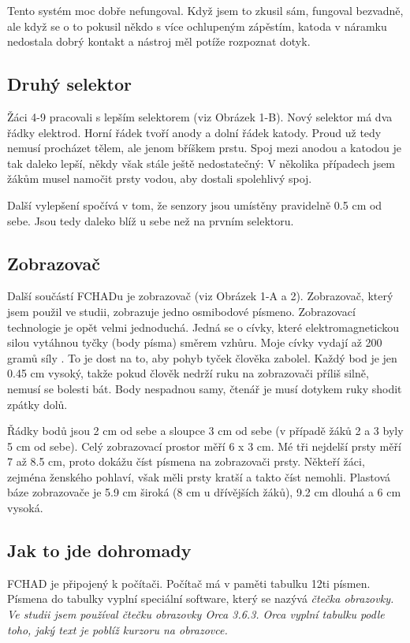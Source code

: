Tento systém moc dobře nefungoval. Když jsem to zkusil sám, fungoval bezvadně, ale když se o to pokusil někdo s více ochlupeným zápěstím, katoda v náramku nedostala dobrý kontakt a nástroj měl potíže rozpoznat dotyk.

\subsection{Druhý selektor}

Žáci 4-9 pracovali s lepším selektorem (viz Obrázek 1-B). Nový selektor má dva řádky elektrod. Horní řádek tvoří anody a dolní řádek katody.  Proud už tedy nemusí procházet tělem, ale jenom bříškem prstu.  Spoj mezi anodou a katodou je tak daleko lepší, někdy však stále ještě nedostatečný: V několika případech jsem žákům musel namočit prsty vodou, aby dostali spolehlivý spoj.

Další vylepšení spočívá v tom, že senzory jsou umístěny pravidelně 0.5 cm od sebe.  Jsou tedy daleko blíž u sebe než na prvním selektoru.

\subsection{Zobrazovač}
Další součástí FCHADu je zobrazovač (viz Obrázek 1-A a 2).  Zobrazovač, který jsem použil ve studii, zobrazuje jedno osmibodové písmeno.  Zobrazovací technologie je opět velmi jednoduchá.  Jedná se o cívky, které elektromagnetickou silou vytáhnou tyčky (body písma) směrem vzhůru.  Moje cívky vydají až 200 gramů síly \citep{multicomp}.  To je dost na to, aby pohyb tyček člověka zabolel.  Každý bod je jen 0.45 cm vysoký, takže pokud člověk nedrží ruku na zobrazovači příliš silně, nemusí se bolesti bát.  Body nespadnou samy, čtenář je musí dotykem ruky shodit zpátky dolů.

Řádky bodů jsou 2 cm od sebe a sloupce 3 cm od sebe (v případě žáků 2 a 3 byly 5 cm od sebe).  Celý zobrazovací prostor měří 6 x 3 cm.  Mé tři nejdelší prsty měří 7 až 8.5 cm, proto dokážu číst písmena na zobrazovači prsty.  Někteří žáci, zejména ženského pohlaví, však měli prsty kratší a takto číst nemohli.  Plastová báze zobrazovače je 5.9 cm široká (8 cm u dřívějších žáků), 9.2 cm dlouhá a 6 cm vysoká.

\subsection{Jak to jde dohromady}

FCHAD je připojený k počítači. Počítač má v paměti tabulku 12ti písmen.  Písmena do tabulky vyplní speciální software, který se nazývá \em čtečka obrazovky\em .  Ve studii jsem používal čtečku obrazovky Orca 3.6.3. Orca vyplní tabulku podle toho, jaký text je poblíž kurzoru na obrazovce.

